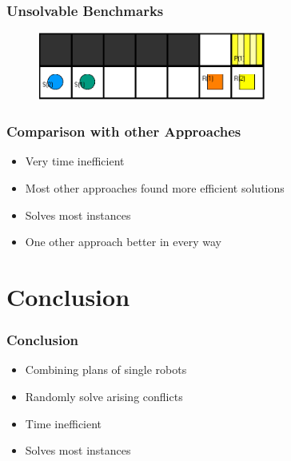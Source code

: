 \documentclass{beamer}
\begin{document}
\begin{frame}
\frametitle{Unsolvable Benchmarks}
\begin{figure}
\includegraphics[width=75mm]{Images/Instance 3}
\end{figure}
\end{frame}

\begin{frame}
\frametitle{Comparison with other Approaches}
\begin{itemize}
\item<2-> Very time inefficient
\item<3-> Most other approaches found more efficient solutions
\item<4-> Solves most instances
\item<5-> One other approach better in every way
\end{itemize}
\end{frame}

\section{Conclusion}
\begin{frame}
\frametitle{Conclusion}
\begin{itemize}
\item<2-> Combining plans of single robots
\item<3-> Randomly solve arising conflicts
\item<4-> Time inefficient
\item<5-> Solves most instances
\end{itemize}
\end{frame}
\end{document}

